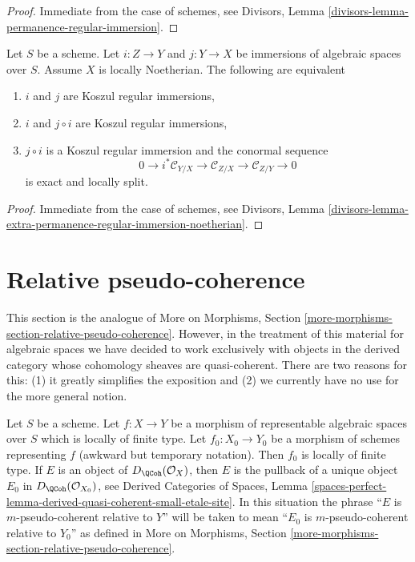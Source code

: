 \begin{proof}
Immediate from the case of schemes, see
Divisors, Lemma \ref{divisors-lemma-permanence-regular-immersion}.
\end{proof}

\begin{lemma}
\label{lemma-extra-permanence-regular-immersion-noetherian}
Let $S$ be a scheme. Let $i : Z \to Y$ and $j : Y \to X$ be immersions of
algebraic spaces over $S$. Assume $X$ is locally Noetherian.
The following are equivalent
\begin{enumerate}
\item $i$ and $j$ are Koszul regular immersions,
\item $i$ and $j \circ i$ are Koszul regular immersions,
\item $j \circ i$ is a Koszul regular immersion and the conormal sequence
$$
0 \to i^*\mathcal{C}_{Y/X} \to
\mathcal{C}_{Z/X} \to
\mathcal{C}_{Z/Y} \to 0
$$
is exact and locally split.
\end{enumerate}
\end{lemma}

\begin{proof}
Immediate from the case of schemes, see Divisors, Lemma
\ref{divisors-lemma-extra-permanence-regular-immersion-noetherian}.
\end{proof}














\section{Relative pseudo-coherence}
\label{section-relative-pseudo-coherence}

\noindent
This section is the analogue of
More on Morphisms, Section
\ref{more-morphisms-section-relative-pseudo-coherence}.
However, in the treatment of this material for
algebraic spaces we have decided to work exclusively
with objects in the derived category whose cohomology
sheaves are quasi-coherent. There are two reasons for this:
(1) it greatly simplifies the exposition and
(2) we currently have no use for the more general notion.

\begin{remark}
\label{remark-match-relative-pseudo-coherence}
Let $S$ be a scheme. Let $f : X \to Y$ be a morphism of representable
algebraic spaces over $S$ which is locally of finite type. Let
$f_0 : X_0 \to Y_0$ be a morphism of schemes representing $f$
(awkward but temporary notation). Then $f_0$ is locally of finite type.
If $E$ is an object of $D_\QCoh(\mathcal{O}_X)$, then $E$
is the pullback of a unique object $E_0$ in $D_\QCoh(\mathcal{O}_{X_0})$, see
Derived Categories of Spaces, Lemma
\ref{spaces-perfect-lemma-derived-quasi-coherent-small-etale-site}.
In this situation the phrase ``$E$ is $m$-pseudo-coherent relative to $Y$''
will be taken to mean ``$E_0$ is $m$-pseudo-coherent relative to $Y_0$''
as defined in More on Morphisms, Section
\ref{more-morphisms-section-relative-pseudo-coherence}.
\end{remark}

